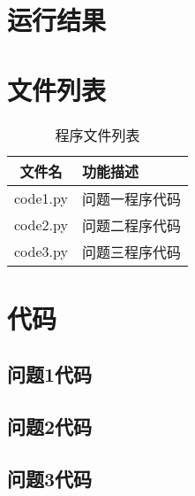 \documentclass[withoutpreface,bwprint]{cumcmthesis} %
\begin{document}
\newpage
\begin{appendices}

\section{运行结果}


\section{文件列表}
\begin{table}[H]
    \caption{程序文件列表}
    \centering
    \begin{tabularx}{0.85\textwidth}{c l}
        \bottomrule[1.5pt]
        文件名 & 功能描述 \\
        \midrule[1pt]
        code1.py & 问题一程序代码 \\
        code2.py & 问题二程序代码 \\
        code3.py & 问题三程序代码 \\
        \bottomrule[1.5pt]
    \end{tabularx}
    \label{tab:文件列表}
\end{table}

\section{代码}
\subsection{问题1代码}


\subsection{问题2代码}


\subsection{问题3代码}


\end{appendices}
\end{document}
